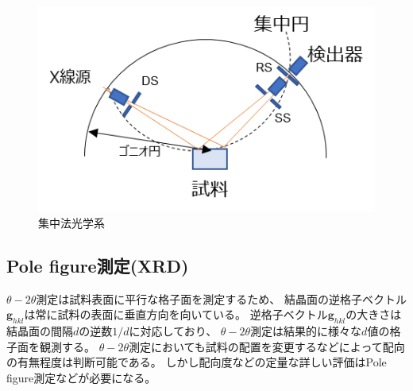 \documentclass[dvipdfmx,12pt,a4paper]{jreport}
\begin{document}
			\newpage
			\begin{figure}[h]
				\centering
				\includegraphics[scale=1.3]{XRD_theta_2theta_光学系.png}
				\caption{集中法光学系}
				\label{集中法光学系}
			\end{figure}

			\subsection{Pole figure測定(XRD)}
			$\theta-2\theta$測定は試料表面に平行な格子面を測定するため、
			結晶面の逆格子ベクトル$\bm{g}_{hkl}$は常に試料の表面に垂直方向を向いている。
			逆格子ベクトル$\bm{g}_{hkl}$の大きさは結晶面の間隔$d$の逆数$1/d$に対応しており、
			$\theta-2\theta$測定は結果的に様々な$d$値の格子面を観測する。
			$\theta-2\theta$測定においても試料の配置を変更するなどによって配向の有無程度は判断可能である。
			しかし配向度などの定量な詳しい評価はPole figure測定などが必要になる。
			
\end{document}
